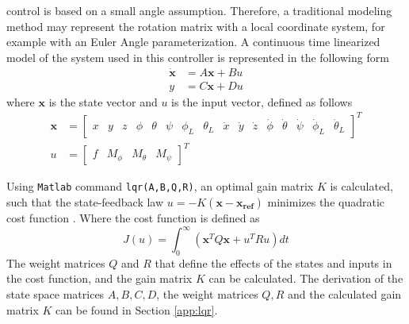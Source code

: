  control is based on a small angle assumption. Therefore, a traditional modeling method may represent the rotation matrix with a local coordinate system, for example with an Euler Angle parameterization. 
A continuous time linearized model of the system used in this controller is represented in the following form 
\begin{align}\label{eq:ss}
\mathbf{\dot{x} }&=A\mathbf{x}+Bu\\
y&=C\mathbf{x}+Du
\end{align}
where $ \mathbf{x} $ is the state vector and $ u $ is the input vector, defined as follows
\begin{align}\label{eq:state}
\mathbf{x}&=\begin{bmatrix}
x&y&z&\phi&\theta&\psi&\phi_L&\theta_L&\dot{x}&\dot{y}&\dot{z}&\dot{\phi}&\dot{\theta}&\dot{\psi}&\dot{\phi}_L&\dot{\theta}_L
\end{bmatrix}^T\\
u&=\begin{bmatrix}
f&M_\phi&M_\theta&M_\psi
\end{bmatrix}^T
\end{align}

Using \texttt{Matlab} command \texttt{lqr(A,B,Q,R)}, an optimal gain matrix $ K $ is calculated, such that the state-feedback law $ u=-K(\mathbf{x-x_{ref}}) $ minimizes the quadratic cost function \cite{Reyes-Valeria2013}. Where the cost function is defined as 
\begin{equation}\label{key}
J(u)=\int_{0}^{\infty}(\mathbf{x}^TQ\mathbf{x}+u^TRu)dt
\end{equation}
The weight matrices $ Q $ and $ R $ that define the effects of the states and inputs in the cost function, and the gain matrix $K $ can be calculated. 
The derivation of the state space matrices $ A, B, C, D $, the weight matrices $ Q,R $ and the calculated gain matrix $ K $ can be found in Section \ref{app:lqr}. 


